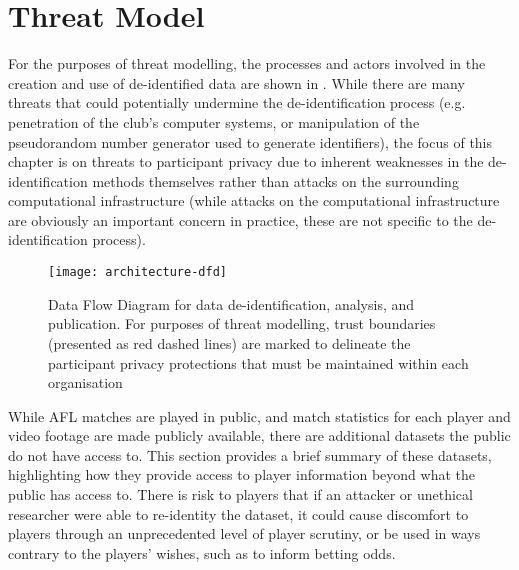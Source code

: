 \section{Threat Model} \label{sec:threat-model}

For the purposes of threat modelling, the processes and actors involved in the creation and use of de-identified data are shown in . While there are many threats that could potentially undermine the de-identification process (e.g. penetration of the club's computer systems, or manipulation of the pseudorandom number generator used to generate identifiers), the focus of this chapter is on threats to participant privacy due to inherent weaknesses in the de-identification methods themselves rather than attacks on the surrounding computational infrastructure (while attacks on the computational infrastructure are obviously an important concern in practice, these are not specific to the de-identification process).

\begin{figure}[htbp]
  \centering
  \texttt{[image: architecture-dfd]}
  \caption{Data Flow Diagram for data de-identification, analysis, and publication. For purposes of threat modelling, trust boundaries (presented as red dashed lines) are marked to delineate the participant privacy protections that must be maintained within each organisation}
  \label{fig:dfd}
\end{figure}



While AFL matches are played in public, and match statistics for each player and video footage are made publicly available, there are additional datasets the public do not have access to. This section provides a brief summary of these datasets, highlighting how they provide access to player information beyond what the public has access to. There is risk to players that if an attacker or unethical researcher were able to re-identity the dataset, it could cause discomfort to players through an unprecedented level of player scrutiny, or be used in ways contrary to the players' wishes, such as to inform betting odds.


